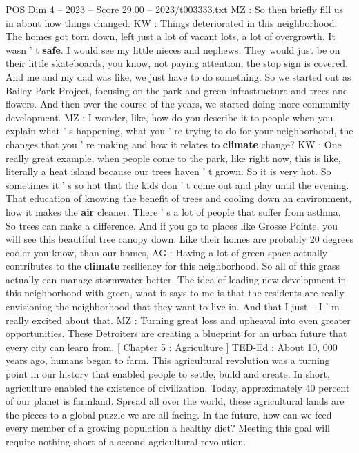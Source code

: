 \begin{textsample}{POS Dim 4 – 2023 – Score 29.00 – 2023/t003333.txt}
MZ : So then briefly fill us in about how things changed.
KW : Things deteriorated in this neighborhood.
The homes got torn down, left just a lot of vacant lots, a lot of overgrowth.
It wasn ' t \textbf{safe}.
I would see my little nieces and nephews.
They would just be on their little skateboards, you know, not paying attention, the stop sign is covered.
And me and my dad was like, we just have to do something.
So we started out as Bailey Park Project, focusing on the park and green infrastructure and trees and flowers.
And then over the course of the years, we started doing more community development.
MZ : I wonder, like, how do you describe it to people when you explain what ' s happening, what you ' re trying to do for your neighborhood, the changes that you ' re making and how it relates to \textbf{climate} change?
KW : One really great example, when people come to the park, like right now, this is like, literally a heat island because our trees haven ' t grown.
So it is very hot.
So sometimes it ' s so hot that the kids don ' t come out and play until the evening.
That education of knowing the benefit of trees and cooling down an environment, how it makes the \textbf{air} cleaner.
There ' s a lot of people that suffer from asthma.
So trees can make a difference.
And if you go to places like Grosse Pointe, you will see this beautiful tree canopy down.
Like their homes are probably 20 degrees cooler you know, than our homes, AG : Having a lot of green space actually contributes to the \textbf{climate} resiliency for this neighborhood.
So all of this grass actually can manage stormwater better.
The idea of leading new development in this neighborhood with green, what it says to me is that the residents are really envisioning the neighborhood that they want to live in.
And that I just -- I ' m really excited about that.
MZ : Turning great loss and upheaval into even greater opportunities.
These Detroiters are creating a blueprint for an urban future that every city can learn from. [ Chapter 5 : Agriculture ] TED-Ed : About 10, 000 years ago, humans began to farm.
This agricultural revolution was a turning point in our history that enabled people to settle, build and create.
In short, agriculture enabled the existence of civilization.
Today, approximately 40 percent of our planet is farmland.
Spread all over the world, these agricultural lands are the pieces to a global puzzle we are all facing.
In the future, how can we feed every member of a growing population a healthy diet?
Meeting this goal will require nothing short of a second agricultural revolution.

\end{textsample}
